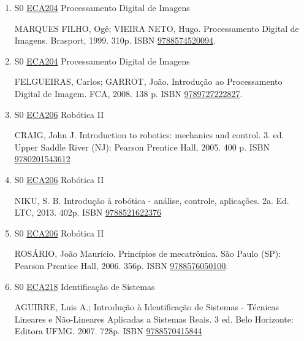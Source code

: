 \documentclass[12pt,a4paper]{book}
\begin{document}
\begin{enumerate}
 
 
 \item S0 \hyperref[PUD:ECA204]{ECA204} Processamento Digital de Imagens

  MARQUES FILHO, Ogê;  VIEIRA NETO, Hugo.  Processamento Digital de Imagens.  Brasport, 1999.  310p.  ISBN \href{http://www.bn.br/site/pages/servicosProfissionais/agenciaISBN/isbnBusca/FbnBuscaISBNCatalogo.asp?pField=ISBN&pIntPagina=1&pISBN=74520094&nidbISBN=true&hidbISBN=true}{9788574520094}. 

 
 
 \item S0 \hyperref[PUD:ECA204]{ECA204} Processamento Digital de Imagens

  FELGUEIRAS, Carlos;  GARROT, João.  Introdução ao Processamento Digital de Imagem.  FCA, 2008.  138 p.  ISBN \href{http://www.google.com/search?hl=pt-BR&tbo=p&tbm=bks&q=isbn:9789727222827&num=10}{9789727222827}.
 \item S0 \hyperref[PUD:ECA206]{ECA206} Robótica II

 CRAIG, John J.  Introduction to robotics: mechanics and control.  3. ed.  Upper Saddle River (NJ): Pearson Prentice Hall, 2005.  400 p.  ISBN \href{http://www.isbnsearch.org/isbn/9780201543612}{9780201543612}
 
 
 \item S0 \hyperref[PUD:ECA206]{ECA206} Robótica II

  NIKU, S.  B.  Introdução à robótica - análise, controle, aplicações.  2a.  Ed.  LTC, 2013.  402p.  ISBN \href{http://www.bn.br/site/pages/servicosProfissionais/agenciaISBN/isbnBusca/FbnBuscaISBNCatalogo.asp?pField=ISBN&pIntPagina=1&pISBN=21622376&nidbISBN=true&hidbISBN=true}{9788521622376}
 
 
 \item S0 \hyperref[PUD:ECA206]{ECA206} Robótica II

 ROSÁRIO, João Maurício.  Princípios de mecatrônica.  São Paulo (SP): Pearson Prentice Hall, 2006.  356p.  ISBN \href{http://www.bn.br/site/pages/servicosProfissionais/agenciaISBN/isbnBusca/FbnBuscaISBNCatalogo.asp?pField=ISBN&pIntPagina=1&pISBN=76050100&nidbISBN=true&hidbISBN=true}{9788576050100}.
 \item S0 \hyperref[PUD:ECA218]{ECA218} Identificação de Sistemas

 AGUIRRE, Luis A.;  Introdução à Identificação de Sistemas - Técnicas Lineares e
Não-Lineares Aplicadas a Sistemas Reais.  3 ed.  Belo Horizonte: Editora UFMG.  2007. 
728p.  ISBN \href{http://www.bn.br/site/pages/servicosProfissionais/agenciaISBN/isbnBusca/FbnBuscaISBNCatalogo.asp?pField=ISBN&pIntPagina=1&pISBN=70415844&nidbISBN=true&hidbISBN=true}{9788570415844}
 

\end{enumerate}
\end{document}
